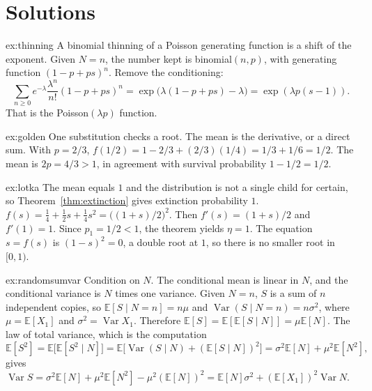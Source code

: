 \section{Solutions}

\begin{solution}{ex:thinning}
\idea A binomial thinning of a Poisson generating function is a shift of the exponent.
\writeup Given $N=n$, the number kept is binomial$(n,p)$, with generating function $(1-p+ps)^n$. Remove the conditioning:
\[
 \sum_{n\ge0}e^{-\lambda}\frac{\lambda^n}{n!}(1-p+ps)^n=\exp\bigl(\lambda(1-p+ps)-\lambda\bigr)=\exp(\lambda p(s-1)).
\]
That is the Poisson$(\lambda p)$ function.
\end{solution}

\begin{solution}{ex:golden}
\idea One substitution checks a root. The mean is the derivative, or a direct sum.
\writeup With $p=2/3$, $f(1/2)=1-2/3+(2/3)(1/4)=1/3+1/6=1/2$. The mean is $2p=4/3>1$, in agreement with survival probability $1-1/2=1/2$.
\end{solution}

\begin{solution}{ex:lotka}
\idea The mean equals $1$ and the distribution is not a single child for certain, so Theorem~\ref{thm:extinction} gives extinction probability $1$.
\writeup $f(s)=\tfrac14+\tfrac12 s+\tfrac14 s^2=\bigl((1+s)/2\bigr)^2$. Then $f'(s)=(1+s)/2$ and $f'(1)=1$. Since $p_1=1/2<1$, the theorem yields $\eta=1$. The equation $s=f(s)$ is $(1-s)^2=0$, a double root at $1$, so there is no smaller root in $[0,1)$.
\end{solution}

\begin{solution}{ex:randomsumvar}
\idea Condition on $N$. The conditional mean is linear in $N$, and the conditional variance is $N$ times one variance.
\writeup Given $N=n$, $S$ is a sum of $n$ independent copies, so $\mathbb E[S\mid N=n]=n\mu$ and $\operatorname{Var}(S\mid N=n)=n\sigma^2$, where $\mu=\mathbb E[X_1]$ and $\sigma^2=\operatorname{Var}X_1$. Therefore $\mathbb E[S]=\mathbb E[\mathbb E[S\mid N]]=\mu\mathbb E[N]$. The law of total variance, which is the computation
\[
 \mathbb E[S^2]=\mathbb E\bigl[\mathbb E[S^2\mid N]\bigr]=\mathbb E\bigl[\operatorname{Var}(S\mid N)+(\mathbb E[S\mid N])^2\bigr]
 =\sigma^2\mathbb E[N]+\mu^2\mathbb E[N^2],
\]
gives $\operatorname{Var}S=\sigma^2\mathbb E[N]+\mu^2\mathbb E[N^2]-\mu^2(\mathbb E[N])^2=\mathbb E[N]\sigma^2+(\mathbb E[X_1])^2\operatorname{Var}N$.
\end{solution}

